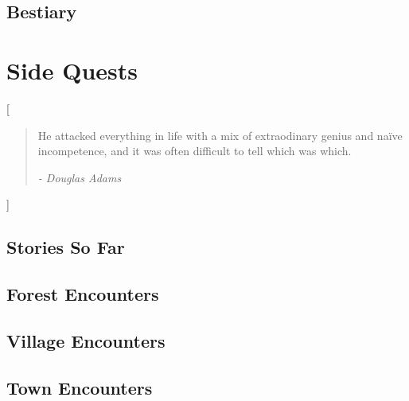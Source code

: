 \documentclass[a4paper,openany]{report}
\begin{document}


\chapter{Bestiary}





\part{Side Quests}[\vspace{4cm}\begin{quote}
\center He attacked everything in life with a mix of extraodinary genius and na\"ive incompetence, and it was often difficult to tell which was which.

	\flushright\textit{- Douglas Adams}
\end{quote}

\vspace{3cm}

]

\chapter{Stories So Far}



\chapter{Forest Encounters}

\newcommand{\lescounter}{\addtocounter{enc}{-1}}




\chapter{Village Encounters}



\chapter{Town Encounters}






\printglossary

\label{lastpage}

\printindex


\end{document}
